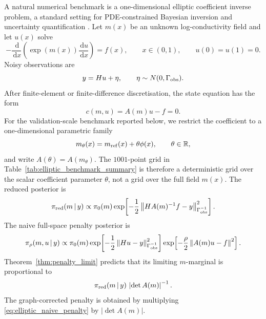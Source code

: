 \documentclass[11pt]{article}
\newcommand{\R}{\mathbb{R}}
\newcommand{\dd}{\,\mathrm{d}}
\newcommand{\abs}[1]{\left\lvert #1\right\rvert}
\newcommand{\norm}[1]{\left\lVert #1\right\rVert}
\newcommand{\given}{\,|\,}
\begin{document}
A natural numerical benchmark is a one-dimensional elliptic coefficient inverse problem, a standard setting for PDE-constrained Bayesian inversion and uncertainty quantification \cite{BuiThanhGirolami2014,BuiThanhNguyen2016, FlathWilcoxAkcelikHillVanBloemenWaandersGhattas2011, MartinWilcoxBursteddeGhattas2012,PetraMartinStadlerGhattas2014, CuiMartinMarzoukSolonenSpantini2014,CuiLawMarzouk2016}. Let \(m(x)\) be an unknown log-conductivity field and let \(u(x)\) solve
\begin{equation}
 -\frac{\dd}{\dd x}\left(\exp(m(x))\frac{\dd u}{\dd x}\right)=f(x),
 \qquad x\in(0,1),
 \qquad u(0)=u(1)=0.
 \label{eq:elliptic_pde}
\end{equation}
Noisy observations are
\begin{equation}
 y = H u + \eta,
 \qquad
 \eta\sim N(0,\Gamma_{\rm obs}).
\end{equation}
After finite-element or finite-difference discretisation, the state equation has the form
\begin{equation}
 c(m,u)=A(m)u-f=0.
 \label{eq:discrete_elliptic_constraint}
\end{equation}
For the validation-scale benchmark reported below, we restrict the coefficient to a one-dimensional parametric family
\begin{equation}
 m_\theta(x)=m_{\rm ref}(x)+\theta\phi(x),
 \qquad \theta\in\R,
 \label{eq:scalar_coefficient_family}
\end{equation}
and write \(A(\theta)=A(m_\theta)\). The \(1001\)-point grid in Table~\ref{tab:elliptic_benchmark_summary} is therefore a deterministic grid over the scalar coefficient parameter \(\theta\), not a grid over the full
field \(m(x)\).
The reduced posterior is
\begin{equation}
 \pi_{\rm red}(m\given y)
 \propto
 \pi_0(m)
 \exp\!\left[-\frac{1}{2}\norm{H A(m)^{-1}f-y}_{\Gamma_{\rm obs}^{-1}}^2\right].
 \label{eq:elliptic_reduced_posterior}
\end{equation}
The naive full-space penalty posterior is
\begin{equation}
 \pi_\rho(m,u\given y)
 \propto
 \pi_0(m)
 \exp\!\left[-\frac{1}{2}\norm{Hu-y}_{\Gamma_{\rm obs}^{-1}}^2\right]
 \exp\!\left[-\frac{\rho}{2}\norm{A(m)u-f}^2\right].
 \label{eq:elliptic_naive_penalty}
\end{equation}
Theorem~\ref{thm:penalty_limit} predicts that its limiting \(m\)-marginal is proportional to
\begin{equation}
 \pi_{\rm red}(m\given y)\,\abs{\det A(m)}^{-1}.
 \label{eq:elliptic_naive_limit}
\end{equation}
The graph-corrected penalty is obtained by multiplying \eqref{eq:elliptic_naive_penalty} by \(\abs{\det A(m)}\).
\end{document}
